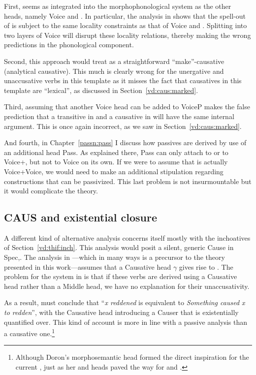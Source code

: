 First, {\vd} seems as integrated into the morphophonological system as the other heads, namely Voice and {\vz}. In particular, the analysis in \cite{kastner18nllt} shows that the spell-out of {\vd} is subject to the same locality constraints as that of Voice and {\vz}. Splitting {\vd} into two layers of Voice will disrupt these locality relations, thereby making the wrong predictions in the phonological component.

Second, this approach would treat {\thif} as a straightforward ``make''-causative (analytical causative). This much is clearly wrong for the unergative and unaccusative verbs in this template as it misses the fact that causatives in this template are ``lexical'', as discussed in Section~\ref{vd:caus:marked}. 

Third, assuming that another Voice head can be added to VoiceP makes the false prediction that a transitive in {\tkal} and a causative in {\thif} will have the same internal argument. This is once again incorrect, as we saw in Section~\ref{vd:caus:marked}.

And fourth, in Chapter~\ref{passn:pass} I discuss how passives are derived by use of an additional head Pass. As explained there, Pass can only attach to {\vd} or to Voice+{\va}, but not to Voice on its own. If we were to assume that {\vd} is actually Voice+Voice, we would need to make an additional stipulation regarding constructions that can be passivized. This last problem is not insurmountable but it would complicate the theory.

	
	\subsection{CAUS and existential closure} \label{vd:others:ed}
A different kind of alternative analysis concerns itself mostly with the inchoatives of Section~\ref{vd:thif:inch}. This analysis would posit a silent, generic Cause in Spec,{\vd}. The analysis in \citet[61]{doron03}---which in many ways is a precursor to the theory presented in this work---assumes that a Causative head $\gamma$ gives rise to {\thif}. The problem for the system in \cite{doron03} is that if these verbs are derived using a Causative head rather than a Middle head, we have no explanation for their unaccusativity.

As a result, \citet[62]{doron03} must conclude that ``\emph{x reddened} is equivalent to \emph{Something caused x to redden}'', with the Causative head  introducing a Causer that is existentially quantified over. This kind of account is more in line with a passive analysis than a causative one.\footnote{Although Doron's morphosemantic head formed the direct inspiration for the current {\vd}, just as her  and  heads paved the way for {\vz} and {\va}.}

